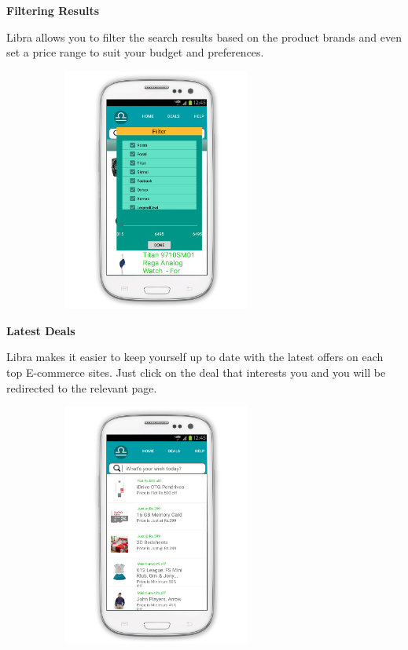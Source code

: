 \textbf{\large Filtering Results}\\
\vspace{2mm}

Libra allows you to filter the search results based on the product brands and even set a price range to suit your budget and preferences.

\begin{figure}[h!]
\centering
\includegraphics[width=8cm, height=8cm]{figure/filtering.png}
\end{figure}

\newpage

\textbf{\large Latest Deals}\\
\vspace{2mm}

Libra makes it easier to keep yourself up to date with the latest offers on each top E-commerce sites. Just click on the deal that interests you and you will be redirected to the relevant page.

\begin{figure}[h!]
\centering
\includegraphics[width=8cm, height=8cm]{figure/latestdeals.png}
\end{figure}

